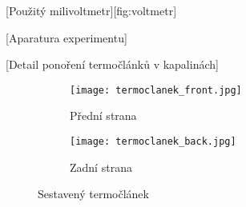 [Použitý milivoltmetr][fig:voltmetr]

[Aparatura experimentu]

[Detail ponoření termočlánků v kapalinách]

\begin{figure}[htpb]
	\hfill
	\centering
	\begin{subfigure}{0.45\textwidth}
		\centering
		\texttt{[image: termoclanek\_front.jpg]}
		\caption{Přední strana}
	\end{subfigure}
	\hfill
	\begin{subfigure}{0.45\textwidth}
		\centering
		\texttt{[image: termoclanek\_back.jpg]}
		\caption{Zadní strana}
	\end{subfigure}
	\hfill
	\caption{Sestavený termočlánek}
	\label{fig:termoclanek}
\end{figure}
